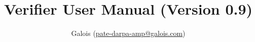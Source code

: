 \documentclass[11pt]{article}
\title{\pate{} Verifier User Manual (Version 0.9)}
\author{Galois (\href{mailto:pate-darpa-amp@galois.com}{pate-darpa-amp@galois.com})}
\begin{document}
{\let\newpage\relax\maketitle}


\newpage
\tableofcontents
\newpage

\acresetall






\clearpage

\end{document}

